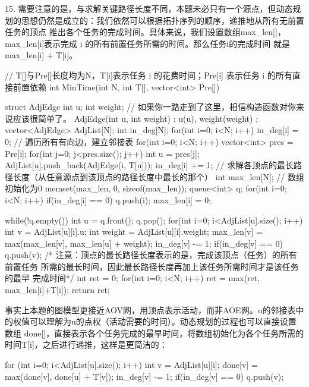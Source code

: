 15. 需要注意的是，与求解关键路径长度不同，本题未必只有一个源点，但动态规划的思想仍然是成立的：我们依然可以根据拓扑序列的顺序，递推地从所有无前置任务的顶点
推出各个任务的完成时间。具体来说，我们设置数组max\_len[]，max\_len[i]表示完成 i 的所有前置任务所需的时间。那么任务i的完成时间
就是max\_len[i] + T[i]。
\begin{cppcode}
    // T[]与Pre[]长度均为N，T[i]表示任务 i 的花费时间；Pre[i] 表示任务 i 的所有直接前置依赖
    int MinTime(int N, int T[], vector<int> Pre[]) {
        struct AdjEdge {
            int u;
            int weight;
            // 如果你一路走到了这里，相信构造函数对你来说应该很简单了。
            AdjEdge(int u, int weight) : u(u), weight(weight) {}
        };
        vector<AdjEdge> AdjList[N];
        int in_deg[N];
        for(int i=0; i<N; i++) {
            in_deg[i] = 0;
        }
        // 遍历所有有向边，建立邻接表
        for(int i=0; i<N; i++) {
            vector<int> pres = Pre[i];
            for(int j=0; j<pres.size(); j++) {
                int u = pres[j];
                AdjList[u].push_back(AdjEdge(i, T[u]));
                in_deg[i] += 1;
            }
        }
        // 求解各顶点的最长路径长度（从任意源点到该顶点的路径长度中最长的那个）
        int max_len[N];
        // 数组初始化为0
        memset(max_len, 0, sizeof(max_len));
        queue<int> q;
        for(int i=0; i<N; i++) {
            if(in_deg[i] == 0) {
                q.push(i);
                max_len[i] = 0;
            }
        }

        while(!q.empty()) {
            int u = q.front();
            q.pop();
            for(int i=0; i<AdjList[u].size(); i++) {
                int v = AdjList[u][i].u;
                int weight = AdjList[u][i].weight;
                max_len[v] = max(max_len[v], max_len[u] + weight);
                in_deg[v] -= 1;
                if(in_deg[v] == 0) {
                    q.push(v);
                }
            }
        }
        /* 注意：顶点的最长路径长度表示的是，完成该顶点（任务）的所有前置任务
        所需的最长时间，因此最长路径长度再加上该任务所需时间才是该任务的最早
        完成时间*/
        int ret = 0;
        for(int i=0; i<N; i++) {
            ret = max(ret, max_len[i]+T[i]);
        }
        return ret;

    }
\end{cppcode}
事实上本题的图模型更接近AOV网，用顶点表示活动，而非AOE网。u的邻接表中的权值可以理解为u的点权（活动需要的时间）。动态规划的过程也可以直接设置数组
done[]，直接表示各个任务完成的最早时间，将数组初始化为各个任务所需的时间T[i]，之后进行递推，这样是更简洁的：

\begin{cppcode}
    for (int i=0; i<AdjList[u].size(); i++) {
        int v = AdjList[u][i];
        done[v] = max(done[v], done[u] + T[v]);
        in_deg[v] -= 1;
        if(in_deg[v] == 0) {
            q.push(v);
        }
    }
\end{cppcode}

\vspace{\baselineskip}




